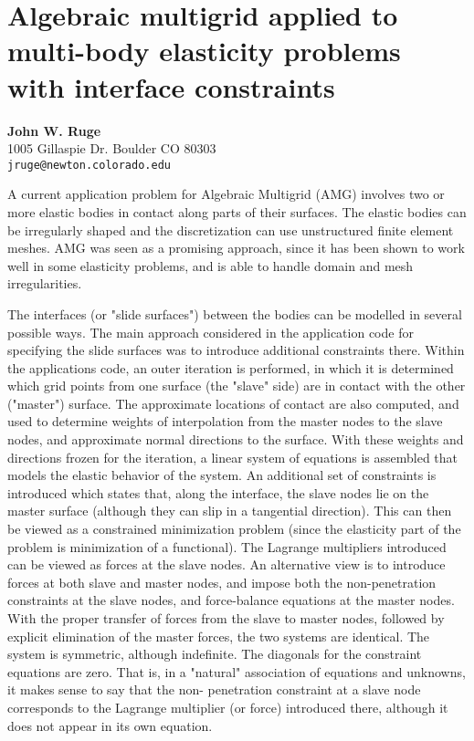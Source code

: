 \documentclass[11pt]{article}
\newcommand{\nextab}[4]{
	\section{#2}
	{\bf #1} \\ \nopagebreak
	{#3} \\ \nopagebreak
	{\tt #4} \nopagebreak
	}
\begin{document}

\nextab{John W. Ruge}
	{Algebraic multigrid applied to multi-body elasticity
		problems with interface constraints}
	{1005 Gillaspie Dr.
	Boulder CO 80303}
	{jruge@newton.colorado.edu}

A current application problem for Algebraic Multigrid (AMG) involves two
or more elastic bodies in contact along parts of their surfaces. The
elastic bodies can be irregularly shaped and the discretization can use
unstructured finite element meshes. AMG was seen as a promising
approach, since it has been shown to work well in some elasticity
problems, and is able to handle domain and mesh irregularities.

The interfaces (or "slide surfaces") between the bodies can be modelled
in several possible ways. The main approach considered in the
application code for specifying the slide surfaces was to introduce
additional constraints there. Within the applications code, an outer
iteration is performed, in which it is determined which grid points from
one surface (the "slave" side) are in contact with the other ("master")
surface. The approximate locations of contact are also computed, and
used to determine weights of interpolation from the master nodes to the
slave nodes, and approximate normal directions to the surface.  With
these weights and directions frozen for the iteration, a linear system
of equations is assembled that models the elastic behavior of the
system.  An additional set of constraints is introduced which states
that, along the interface, the slave nodes lie on the master surface
(although they can slip in a tangential direction). This can then be
viewed as a constrained minimization problem (since the elasticity part
of the problem is minimization of a functional). The Lagrange
multipliers introduced can be viewed as forces at the slave nodes. An
alternative view is to introduce forces at both slave and master nodes,
and impose both the non-penetration constraints at the slave nodes, and
force-balance equations at the master nodes. With the proper transfer
of forces from the slave to master nodes, followed by explicit
elimination of the master forces, the two systems are identical. The
system is symmetric, although indefinite. The diagonals for the
constraint equations are zero. That is, in a "natural" association
of equations and unknowns, it makes sense to say that the non-
penetration constraint at a slave node corresponds to the Lagrange
multiplier (or force) introduced there, although it does not appear
in its own equation.
\end{document}
